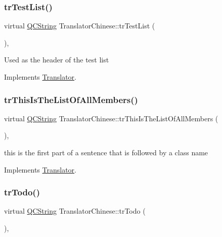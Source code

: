 \subsubsection{\texorpdfstring{trTestList()}{trTestList()}}
{\footnotesize\ttfamily virtual \mbox{\hyperlink{class_q_c_string}{Q\+C\+String}} Translator\+Chinese\+::tr\+Test\+List (\begin{DoxyParamCaption}{ }\end{DoxyParamCaption})\hspace{0.3cm}{\ttfamily [inline]}, {\ttfamily [virtual]}}

Used as the header of the test list 

Implements \mbox{\hyperlink{class_translator}{Translator}}.

\mbox{\label{class_translator_chinese_a2815a5744c7c75d3c938e56ce10d6d1b}} 
\subsubsection{\texorpdfstring{trThisIsTheListOfAllMembers()}{trThisIsTheListOfAllMembers()}}
{\footnotesize\ttfamily virtual \mbox{\hyperlink{class_q_c_string}{Q\+C\+String}} Translator\+Chinese\+::tr\+This\+Is\+The\+List\+Of\+All\+Members (\begin{DoxyParamCaption}{ }\end{DoxyParamCaption})\hspace{0.3cm}{\ttfamily [inline]}, {\ttfamily [virtual]}}

this is the first part of a sentence that is followed by a class name 

Implements \mbox{\hyperlink{class_translator}{Translator}}.

\mbox{\label{class_translator_chinese_a8d52c52102b70ff46537ec756cb5eea5}} 
\subsubsection{\texorpdfstring{trTodo()}{trTodo()}}
{\footnotesize\ttfamily virtual \mbox{\hyperlink{class_q_c_string}{Q\+C\+String}} Translator\+Chinese\+::tr\+Todo (\begin{DoxyParamCaption}{ }\end{DoxyParamCaption})\hspace{0.3cm}{\ttfamily [inline]}, {\ttfamily [virtual]}}

